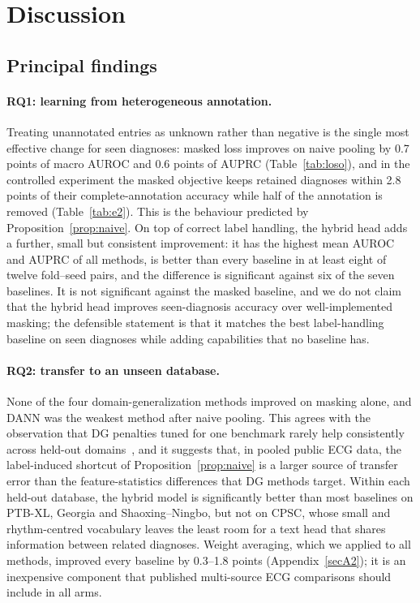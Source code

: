 \section{Discussion}\label{sec:discussion}

\subsection{Principal findings}\label{sec:disc_findings}
\paragraph{RQ1: learning from heterogeneous annotation.}
Treating unannotated entries as unknown rather than negative is the single most effective change for seen diagnoses: masked loss improves on naive pooling by 0.7 points of macro AUROC and 0.6 points of AUPRC (Table~\ref{tab:loso}), and in the controlled experiment the masked objective keeps retained diagnoses within 2.8 points of their complete-annotation accuracy while half of the annotation is removed (Table~\ref{tab:e2}). This is the behaviour predicted by Proposition~\ref{prop:naive}. On top of correct label handling, the hybrid head adds a further, small but consistent improvement: it has the highest mean AUROC and AUPRC of all methods, is better than every baseline in at least eight of twelve fold--seed pairs, and the difference is significant against six of the seven baselines. It is not significant against the masked baseline, and we do not claim that the hybrid head improves seen-diagnosis accuracy over well-implemented masking; the defensible statement is that it matches the best label-handling baseline on seen diagnoses while adding capabilities that no baseline has.

\paragraph{RQ2: transfer to an unseen database.}
None of the four domain-generalization methods improved on masking alone, and DANN was the weakest method after naive pooling. This agrees with the observation that DG penalties tuned for one benchmark rarely help consistently across held-out domains~\cite{ballas2022}, and it suggests that, in pooled public ECG data, the label-induced shortcut of Proposition~\ref{prop:naive} is a larger source of transfer error than the feature-statistics differences that DG methods target. Within each held-out database, the hybrid model is significantly better than most baselines on PTB-XL, Georgia and Shaoxing--Ningbo, but not on CPSC, whose small and rhythm-centred vocabulary leaves the least room for a text head that shares information between related diagnoses. Weight averaging, which we applied to all methods, improved every baseline by 0.3--1.8 points (Appendix~\ref{secA2}); it is an inexpensive component that published multi-source ECG comparisons should include in all arms.

